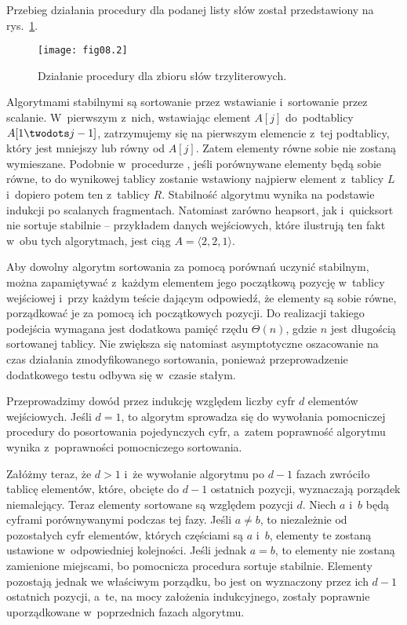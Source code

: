 
\exercise %
Przebieg działania procedury  dla podanej listy słów został przedstawiony na rys.~\ref{fig:8.3-1}.
\begin{figure}[ht]
	\begin{center}
		\texttt{[image: fig08.2]}
	\end{center}
	\caption{Działanie procedury  dla zbioru słów trzyliterowych.} \label{fig:8.3-1}
\end{figure}

\exercise %
Algorytmami stabilnymi są sortowanie przez wstawianie i~sortowanie przez scalanie. W~pierwszym z~nich, wstawiając element $A[j]$ do~podtablicy $A[1\twodots j-1]$, zatrzymujemy się na pierwszym elemencie z~tej podtablicy, który jest mniejszy lub równy od $A[j]$. Zatem elementy równe sobie nie zostaną wymieszane. Podobnie w~procedurze , jeśli porównywane elementy będą sobie równe, to do wynikowej tablicy zostanie wstawiony najpierw element z~tablicy $L$ i~dopiero potem ten z~tablicy $R$. Stabilność algorytmu wynika na podstawie indukcji po scalanych fragmentach. Natomiast zarówno heapsort, jak i~quicksort nie sortuje stabilnie -- przykładem danych wejściowych, które ilustrują ten fakt w~obu tych algorytmach, jest ciąg $A=\langle2,2,1\rangle$.

Aby dowolny algorytm sortowania za pomocą porównań uczynić stabilnym, można zapamiętywać z~każdym elementem jego początkową pozycję w~tablicy wejściowej i~przy każdym teście dającym odpowiedź, że elementy są sobie równe, porządkować je za pomocą ich początkowych pozycji. Do realizacji takiego podejścia wymagana jest dodatkowa pamięć rzędu $\Theta(n)$, gdzie $n$ jest długością sortowanej tablicy. Nie zwiększa się natomiast asymptotyczne oszacowanie na czas działania zmodyfikowanego sortowania, ponieważ przeprowadzenie dodatkowego testu odbywa się w~czasie stałym.

\exercise %
Przeprowadzimy dowód przez indukcję względem liczby cyfr $d$ elementów wejściowych. Jeśli $d=1$, to algorytm  sprowadza się do wywołania pomocniczej procedury do posortowania pojedynczych cyfr, a~zatem poprawność algorytmu wynika z~poprawności pomocniczego sortowania.

Załóżmy teraz, że $d>1$ i~że wywołanie algorytmu  po $d-1$ fazach zwróciło tablicę elementów, które, obcięte do $d-1$ ostatnich pozycji, wyznaczają porządek niemalejący. Teraz elementy sortowane są względem pozycji $d$. Niech $a$ i~$b$ będą cyframi porównywanymi podczas tej fazy. Jeśli $a\ne b$, to niezależnie od pozostałych cyfr elementów, których częściami są $a$ i~$b$, elementy te zostaną ustawione w~odpowiedniej kolejności. Jeśli jednak $a=b$, to elementy nie zostaną zamienione miejscami, bo pomocnicza procedura sortuje stabilnie. Elementy pozostają jednak we właściwym porządku, bo jest on wyznaczony przez ich $d-1$ ostatnich pozycji, a~te, na mocy założenia indukcyjnego, zostały poprawnie uporządkowane w~poprzednich fazach algorytmu.

